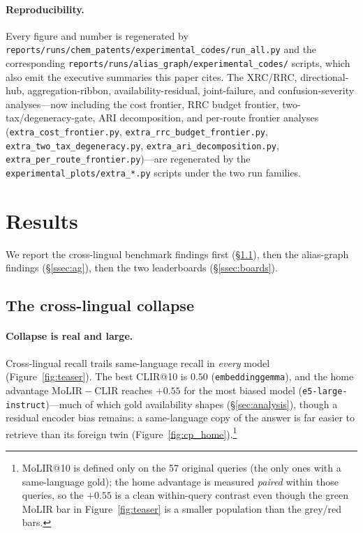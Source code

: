 \documentclass[11pt]{article}
\begin{document}
\paragraph{Reproducibility.}
Every figure and number is regenerated by
\texttt{reports/runs/chem\_patents/experimental\_codes/run\_all.py} and the
corresponding \texttt{reports/runs/alias\_graph/experimental\_codes/} scripts,
which also emit the executive summaries this paper cites. The XRC/RRC,
directional-hub, aggregation-ribbon, availability-residual, joint-failure, and
confusion-severity analyses---now including the cost frontier, RRC budget
frontier, two-tax/degeneracy-gate, ARI decomposition, and per-route frontier
analyses (\texttt{extra\_cost\_frontier.py},
\texttt{extra\_rrc\_budget\_frontier.py},
\texttt{extra\_two\_tax\_degeneracy.py}, \texttt{extra\_ari\_decomposition.py},
\texttt{extra\_per\_route\_frontier.py})---are regenerated by the
\texttt{experimental\_plots/extra\_*.py} scripts under the two run families.

\section{Results}
\label{sec:results}

We report the cross-lingual benchmark findings first (\S\ref{ssec:cp}), then
the alias-graph findings (\S\ref{ssec:ag}), then the two leaderboards
(\S\ref{ssec:boards}).

\subsection{The cross-lingual collapse}
\label{ssec:cp}

\paragraph{Collapse is real and large.}
Cross-lingual recall trails same-language recall in \emph{every} model
(Figure~\ref{fig:teaser}). The best CLIR@10 is $0.50$ (\texttt{embeddinggemma}),
and the home advantage $\mathrm{MoLIR}{-}\mathrm{CLIR}$ reaches $+0.55$ for the
most biased model (\texttt{e5-large-instruct})---much of which gold availability
shapes (\S\ref{sec:analysis}), though a residual encoder bias remains: a
same-language copy of the answer is far easier to retrieve than its foreign twin
(Figure~\ref{fig:cp_home}).\footnote{MoLIR@10 is defined only on the 57 original
queries (the only ones with a same-language gold); the home advantage is
measured \emph{paired} within those queries, so the $+0.55$ is a clean
within-query contrast even though the green MoLIR bar in Figure~\ref{fig:teaser}
is a smaller population than the grey/red bars.}
\end{document}
